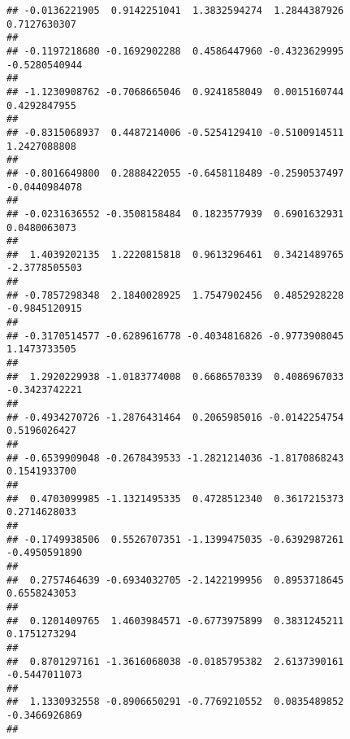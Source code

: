 \documentclass[]{article}
\begin{document}
\begin{verbatim}
## -0.0136221905  0.9142251041  1.3832594274  1.2844387926  0.7127630307 
##                                                                       
## -0.1197218680 -0.1692902288  0.4586447960 -0.4323629995 -0.5280540944 
##                                                                       
## -1.1230908762 -0.7068665046  0.9241858049  0.0015160744  0.4292847955 
##                                                                       
## -0.8315068937  0.4487214006 -0.5254129410 -0.5100914511  1.2427088808 
##                                                                       
## -0.8016649800  0.2888422055 -0.6458118489 -0.2590537497 -0.0440984078 
##                                                                       
## -0.0231636552 -0.3508158484  0.1823577939  0.6901632931  0.0480063073 
##                                                                       
##  1.4039202135  1.2220815818  0.9613296461  0.3421489765 -2.3778505503 
##                                                                       
## -0.7857298348  2.1840028925  1.7547902456  0.4852928228 -0.9845120915 
##                                                                       
## -0.3170514577 -0.6289616778 -0.4034816826 -0.9773908045  1.1473733505 
##                                                                       
##  1.2920229938 -1.0183774008  0.6686570339  0.4086967033 -0.3423742221 
##                                                                       
## -0.4934270726 -1.2876431464  0.2065985016 -0.0142254754  0.5196026427 
##                                                                       
## -0.6539909048 -0.2678439533 -1.2821214036 -1.8170868243  0.1541933700 
##                                                                       
##  0.4703099985 -1.1321495335  0.4728512340  0.3617215373  0.2714628033 
##                                                                       
## -0.1749938506  0.5526707351 -1.1399475035 -0.6392987261 -0.4950591890 
##                                                                       
##  0.2757464639 -0.6934032705 -2.1422199956  0.8953718645  0.6558243053 
##                                                                       
##  0.1201409765  1.4603984571 -0.6773975899  0.3831245211  0.1751273294 
##                                                                       
##  0.8701297161 -1.3616068038 -0.0185795382  2.6137390161 -0.5447011073 
##                                                                       
##  1.1330932558 -0.8906650291 -0.7769210552  0.0835489852 -0.3466926869 
##                                                                       

\end{verbatim}
\end{document}
